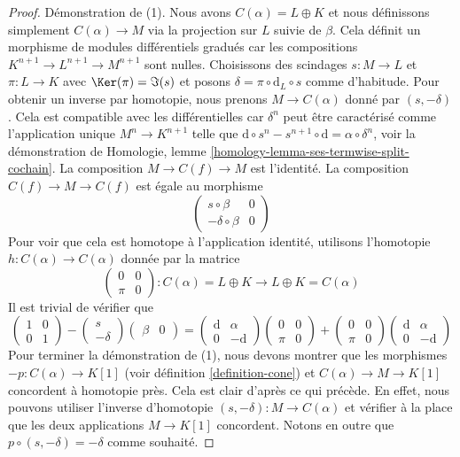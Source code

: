 \begin{proof}
Démonstration de (1). Nous avons $C(\alpha) = L \oplus K$ et nous
définissons simplement $C(\alpha) \to M$ via la projection sur $L$ suivie de
$\beta$. Cela définit un morphisme de modules différentiels gradués car les
compositions $K^{n + 1} \to L^{n + 1} \to M^{n + 1}$ sont nulles.
Choisissons des scindages $s : M \to L$ et $\pi : L \to K$ avec
$\Ker(\pi) = \Im(s)$ et posons $\delta
= \pi \circ \text{d}_L \circ s$ comme d'habitude. Pour
obtenir un inverse par homotopie,
nous prenons $M \to C(\alpha)$ donné par $(s , -\delta)$. Cela est compatible
avec les différentielles car $\delta^n$ peut être caractérisé comme
l'application unique $M^n \to K^{n + 1}$
telle que $\text{d} \circ s^n - s^{n + 1} \circ \text{d} = \alpha \circ \delta^n$,
voir la
démonstration de Homologie, lemme
\ref{homology-lemma-ses-termwise-split-cochain}. La composition $M \to C(f) \to M$ est l'identité. La
composition $C(f) \to M \to C(f)$ est égale au morphisme
$$
\left(
\begin{matrix}
s \circ \beta & 0 \\
-\delta \circ \beta & 0
\end{matrix}
\right)
$$
Pour voir que cela est homotope à l'application
identité, utilisons l'homotopie $h : C(\alpha) \to C(\alpha)$
donnée par la matrice
$$
\left(
\begin{matrix}
0 & 0 \\
\pi & 0
\end{matrix}
\right) :
C(\alpha) = L \oplus K
\to
L \oplus K = C(\alpha)
$$
Il est trivial de vérifier que
$$
\left(
\begin{matrix}
1 & 0 \\
0 & 1
\end{matrix}
\right)
-
\left(
\begin{matrix}
s \\
-\delta
\end{matrix}
\right)
\left(
\begin{matrix}
\beta & 0
\end{matrix}
\right)
=
\left(
\begin{matrix}
\text{d} & \alpha \\
0 & -\text{d}
\end{matrix}
\right)
\left(
\begin{matrix}
0 & 0 \\
\pi & 0
\end{matrix}
\right)
+
\left(
\begin{matrix}
0 & 0 \\
\pi & 0
\end{matrix}
\right)
\left(
\begin{matrix}
\text{d} & \alpha \\
0 & -\text{d}
\end{matrix}
\right)
$$
Pour terminer la démonstration de (1), nous devons montrer que les
morphismes $-p : C(\alpha) \to K[1]$ (voir
définition \ref{definition-cone}) et
$C(\alpha) \to M \to K[1]$ concordent à homotopie
près. Cela est clair d'après ce qui précède. En effet, nous pouvons utiliser l'inverse
d'homotopie $(s, -\delta) : M \to C(\alpha)$ et
vérifier à la place que les deux applications
$M \to K[1]$ concordent. Notons en outre que $p
\circ (s, -\delta) = -\delta$ comme souhaité.


\end{proof}
